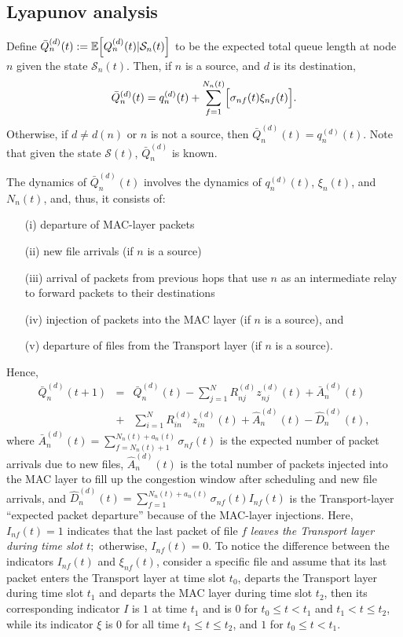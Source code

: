 \documentclass[10pt,onecolumn,draftclsnofoot,journal]{IEEEtran}
\newcommand{\mS}{\mathcal{S}}
\newcommand{\be}{\begin{eqnarray}}
\newcommand{\ee}{\end{eqnarray}}
\newcommand{\expect}[1]{{\mathbb E} \Bigl[ #1\Bigr]}
\begin{document}
\subsection*{Lyapunov analysis}
Define $\bar{Q}^{(d)}_n(t):= \expect{Q^{(d)}_n(t)|\mathcal{S}_n(t)}$ to be the expected total queue length at node $n$ given the state $\mathcal{S}_n(t)$. Then, if $n$ is a source, and $d$ is its destination,
\begin{eqnarray}
\label{eq:q_l_expression}
\bar{Q}^{(d)}_n(t) = q^{(d)}_n(t)+ \sum_{f=1}^{N_n(t)} \Bigl[ \sigma_{nf}(t) \xi_{nf}(t) \Bigr].
\end{eqnarray}
Otherwise, if $d \neq d(n)$ or $n$ is not a source, then $\bar{Q}^{(d)}_n(t) = q^{(d)}_n(t)$. Note that given the state $\mS(t)$, $\bar{Q}_n^{(d)}$ is known.

The dynamics of $\bar{Q}^{(d)}_n(t)$ involves the dynamics of $q^{(d)}_n(t)$, $\xi_n(t)$, and $N_n(t)$, and, thus, it consists of:

\begin{itemize}
\item [(i)]departure of MAC-layer packets
\item[(ii)]new file arrivals (if $n$ is a source)
\item[(iii)]arrival of packets from previous hops that use $n$ as an intermediate relay to forward packets to their destinations
\item[(iv)]injection of packets into the MAC layer (if $n$ is a source), and
\item [(v)] departure of files from the Transport layer (if $n$ is a source).
\end{itemize}
 Hence,
\be \label{eq:expect_q_dynamics}
\bar{Q}^{(d)}_n(t+1) & = & \bar{Q}^{(d)}_n(t) - \sum_{j=1}^NR^{(d)}_{nj} z_{nj}^{(d)}(t) + \bar{A}^{(d)}_n(t) \nonumber \\
& +& \sum_{i=1}^NR^{(d)}_{in} z_{in}^{(d)}(t) + \hat{A}^{(d)}_n(t) -\hat{D}^{(d)}_n(t),
\ee
where $\bar{A}^{(d)}_n(t) =\sum_{f=N_n(t)+1}^{N_n(t)+a_n(t)} \sigma_{nf}(t)$ is the expected number of packet arrivals due to new files,
$\hat{A}_n^{(d)}(t)$ is the total number of packets injected into the MAC layer to fill up the congestion window after scheduling and new file arrivals, and $\hat{D}_n^{(d)}(t)=\sum_{f=1}^{N_n(t)+a_n(t)} \sigma_{nf}(t) I_{nf}(t)$ is the Transport-layer  ``expected packet departure'' because of the MAC-layer injections.
Here, $I_{nf}(t)=1$ indicates that the last packet of file $f$ \textit{leaves the Transport layer during time slot $t;$} otherwise, $I_{nf}(t)=0$. To notice the difference between the indicators $I_{nf}(t)$ and $\xi_{nf}(t)$, consider a specific file and assume that its last packet enters the Transport layer at time slot $t_0$, departs the Transport layer during time slot $t_1$ and departs the MAC layer during time slot $t_2$, then its corresponding indicator $I$ is $1$ at time $t_1$ and is $0$ for $t_0 \leq t < t_1$ and $t_1< t \leq t_2$, while its indicator $\xi$ is $0$ for all time $t_1 \leq t \leq t_2$, and $1$ for $t_0 \leq  t < t_1$.
\end{document}
